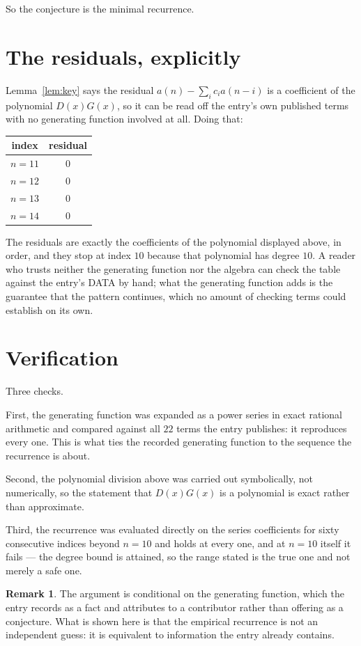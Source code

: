 \documentclass[11pt,a4paper]{article}
\theoremstyle{plain}
\theoremstyle{definition}
\newtheorem{remark}[theorem]{Remark}
\begin{document}
So the conjecture is the minimal recurrence.

\section{The residuals, explicitly}

Lemma~\ref{lem:key} says the residual $a(n)-\sum_ic_ia(n-i)$ is a coefficient of the
polynomial $D(x)G(x)$, so it can be read off the entry's own published terms with no
generating function involved at all. Doing that:
\begin{center}
\begin{tabular}{cc}
index & residual \\ \hline
$n=11$ & $0$ \\
$n=12$ & $0$ \\
$n=13$ & $0$ \\
$n=14$ & $0$
\end{tabular}
\end{center}
The residuals are exactly the coefficients of the polynomial displayed above, in order, and
they stop at index $10$ because that polynomial has degree $10$. A reader who trusts
neither the generating function nor the algebra can check the table against the entry's DATA
by hand; what the generating function adds is the guarantee that the pattern continues, which
no amount of checking terms could establish on its own.

\section{Verification}

Three checks.

First, the generating function was expanded as a power series in exact rational arithmetic and
compared against all $22$ terms the entry publishes: it reproduces every one. This is
what ties the recorded generating function to the sequence the recurrence is about.

Second, the polynomial division above was carried out symbolically, not numerically, so the
statement that $D(x)G(x)$ is a polynomial is exact rather than approximate.

Third, the recurrence was evaluated directly on the series coefficients for sixty consecutive
indices beyond $n=10$ and holds at every one, and at $n=10$ itself it fails --- the
degree bound is attained, so the range stated is the true one and not merely a safe one.

\begin{remark}
The argument is conditional on the generating function, which the entry records as a fact and
attributes to a contributor rather than offering as a conjecture. What is shown here is that
the empirical recurrence is not an independent guess: it is equivalent to information the
entry already contains.
\end{remark}
\end{document}

